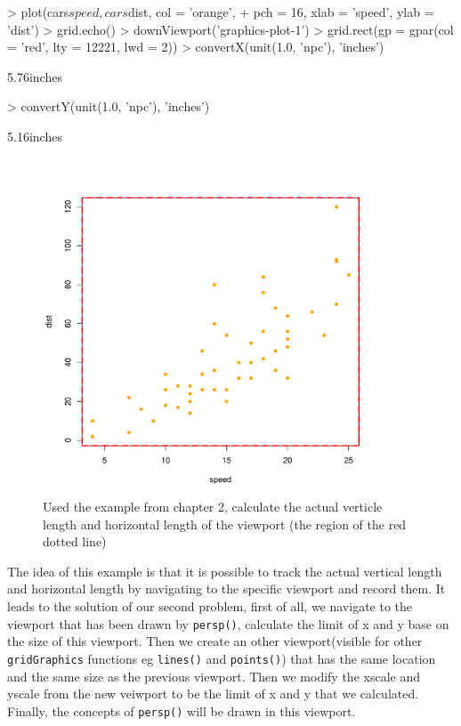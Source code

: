 \documentclass[paper=a4, fontsize=11pt]{report}
\begin{document}
\begin{Schunk}
\begin{Sinput}
> plot(cars$speed, cars$dist, col = 'orange', 
+      pch = 16, xlab = 'speed', ylab = 'dist')
> grid.echo()
> downViewport('graphics-plot-1')
> grid.rect(gp = gpar(col = 'red', lty = 12221, lwd = 2))
> convertX(unit(1.0, 'npc'), 'inches')
\end{Sinput}
\begin{Soutput}
[1] 5.76inches
\end{Soutput}
\begin{Sinput}
> convertY(unit(1.0, 'npc'), 'inches')
\end{Sinput}
\begin{Soutput}
[1] 5.16inches
\end{Soutput}
\end{Schunk}

\begin{figure}[h]
\begin{center}
  \includegraphics[height = 10cm, width = 10cm]{figure/gridGraphics_persp_demo_1.pdf}
  \caption{Used the example from chapter 2, calculate the actual verticle length and horizontal length of the viewport (the region of the red dotted line)}
  	\label{figure8}
\end{center}
\end{figure}

\newpage
The idea of this example is that it is possible to track the actual vertical length and horizontal length by navigating to the specific viewport and record them. It leads to the solution of our second problem, first of all, we navigate to the viewport that has been drawn by \texttt{persp()}, calculate the limit of x and y base on the size of this viewport. Then we create an other viewport(visible for other \texttt{gridGraphics} functions eg \texttt{lines()} and \texttt{points()}) that has the same location and the same size as the previous viewport. Then we modify the xscale and yscale from the new veiwport to be the limit of x and y that we calculated. Finally, the concepts of \texttt{persp()} will be drawn in this viewport. \\
\end{document}
